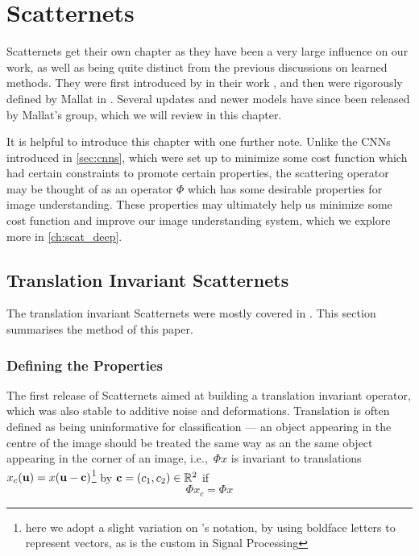 \chapter{Scatternets}\label{ch:scatternets}

  Scatternets get their own chapter as they have been a very large influence on
  our work, as well as being quite distinct from the previous discussions on
  learned methods. They were first introduced by  
  \citeauthor{bruna_classification_2011} in their work 
  \citep{bruna_classification_2011}, and then were rigorously defined by Mallat
  in \citep{mallat_group_2012}. Several updates and newer models have since
  been released by Mallat's group, which we will review in this chapter.
  
  It is helpful to introduce this chapter with one further note. Unlike the
  CNNs introduced in \autoref{sec:cnns}, which were set up to minimize some
  cost function which had certain constraints to promote certain properties,
  the scattering operator may be thought of as an operator $\Phi$ which has
  some desirable properties for image understanding. These properties may
  ultimately help us minimize some cost function and improve our image
  understanding system, which we explore more in
  \autoref{ch:scat_deep}.


  \section{Translation Invariant Scatternets}
  The translation invariant Scatternets were mostly covered in
  \citep{bruna_invariant_2013}. This section summarises the method of this
  paper.

  \subsection{Defining the Properties}
  The first release of Scatternets aimed at building a translation invariant
  operator, which was also stable to additive noise and deformations. Translation
  is often defined as being uninformative for classification --- an object
  appearing in the centre of the image should be treated the same way as an
  the same object appearing in the corner of an image, i.e.,\ $\Phi x$ is
  invariant to translations $x_c(\mathbf{u}) = x(\mathbf{u}-\mathbf{c})$\footnote{here
  we adopt a slight variation on \Bruna's notation, by using boldface letters to
  represent vectors, as is the custom in Signal Processing} by 
  $\mathbf{c}=(c_1,c_2) \in \mathbb{R}^2$ if
  \begin{equation}\label{eq:scat_trans_invariance}
    \Phi x_c = \Phi x
  \end{equation}

